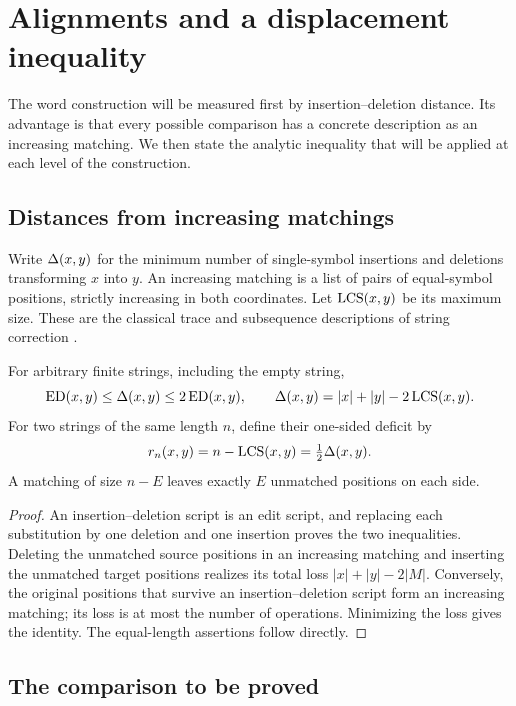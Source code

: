 \section{Alignments and a displacement inequality}\label{sec:displacement}

The word construction will be measured first by insertion--deletion
distance. Its advantage is that every possible comparison has a concrete
description as an increasing matching. We then state the analytic
inequality that will be applied at each level of the construction.

\subsection{Distances from increasing matchings}

Write $\Delta(x,y)$ for the minimum number of single-symbol insertions and
deletions transforming $x$ into $y$. An increasing matching is a list of
pairs of equal-symbol positions, strictly increasing in both coordinates.
Let $\operatorname{LCS}(x,y)$ be its maximum size. These are the classical trace and
subsequence descriptions of string correction
\cite[Sections~3 and~5]{WagnerFischer1974}.

\begin{lemma}\label{lem:alignments}
For arbitrary finite strings, including the empty string,
\begin{equation}\label{eq:metric-comparison}
 \operatorname{ED}(x,y)\le\Delta(x,y)\le2\operatorname{ED}(x,y),
 \qquad
 \Delta(x,y)=|x|+|y|-2\operatorname{LCS}(x,y).
\end{equation}
For two strings of the same length $n$, define their one-sided deficit by
\[
 r_n(x,y)=n-\operatorname{LCS}(x,y)=\tfrac12\Delta(x,y).
\]
A matching of size $n-E$ leaves exactly $E$ unmatched positions on each
side.
\end{lemma}

\begin{proof}
An insertion--deletion script is an edit script, and replacing each
substitution by one deletion and one insertion proves the two
inequalities. Deleting the unmatched source positions in an increasing
matching and inserting the unmatched target positions realizes its
total loss $|x|+|y|-2|M|$. Conversely, the original positions that
survive an insertion--deletion script form an increasing matching; its
loss is at most the number of operations. Minimizing the loss gives the
identity. The equal-length assertions follow directly.
\end{proof}

\subsection{The comparison to be proved}

